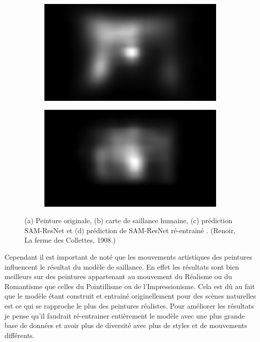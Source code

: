 \begin{figure}[ht]
    \begin{subfigure}{.49\textwidth}
        \includegraphics[width=\linewidth]{datas/samresnet/orig_La_Ferme_des_Collettes_Renoir_1908.png}
        \caption{}
    \end{subfigure}
    \begin{subfigure}{.49\textwidth}
        \includegraphics[width=\linewidth]{datas/samresnet/retrain_La_Ferme_des_Collettes_Renoir_1908.png}
        \caption{}
    \end{subfigure}
    \caption{(a) Peinture originale, (b) carte de saillance humaine, (c) prédiction SAM-ResNet et (d) prédiction de SAM-ResNet ré-entrainé . (Renoir, La ferme des Collettes, 1908.)}
    \label{fig:avantapres}
\end{figure}

\par
Cependant il est important de noté que les mouvements artistiques des peintures influencent le résultat du modèle de saillance. En effet les résultats sont bien meilleurs sur des peintures appartenant au mouvement du Réalisme ou du Romantisme que celles du Pointillisme ou de l'Impressionisme. Cela est dû au fait que le modèle étant construit et entrainé originellement pour des scènes naturelles est ce qui se rapproche le plus des peintures réalistes. Pour améliorer les résultats je pense qu'il faudrait ré-entrainer entièrement le modèle avec une plus grande base de données et avoir plus de diversité avec plus de styles et de mouvements différents.